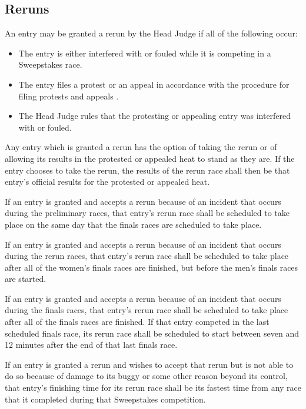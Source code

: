 \subsection{Reruns}

	An entry may be granted a rerun by the Head Judge if all of the following
	occur:
		
	\begin{itemize}

		\item The entry is either interfered with or fouled while it is competing
		in a Sweepstakes race.

		\item The entry files a protest or an appeal in accordance with the
		procedure for filing protests and appeals .

		\item The Head Judge rules that the protesting or appealing entry was
		interfered with or fouled.

	\end{itemize}

	Any entry which is granted a rerun has the option of taking the rerun or of
	allowing its results in the protested or appealed heat to stand as they are. If
	the entry chooses to take the rerun, the results of the rerun race shall then
	be that entry's official results for the protested or appealed heat.

	If an entry is granted and accepts a rerun because of an incident that occurs
	during the preliminary races, that entry's rerun race shall be scheduled to
	take place on the same day that the finals races are scheduled to take place.

	If an entry is granted and accepts a rerun because of an incident that occurs
	during the rerun races, that entry's rerun race shall be scheduled to take
	place after all of the women's finals races are finished, but before the men's
	finals races are started.

	If an entry is granted and accepts a rerun because of an incident that occurs
	during the finals races, that entry's rerun race shall be scheduled to take
	place after all of the finals races are finished. If that entry competed in the
	last scheduled finals race, its rerun race shall be scheduled to start between
	seven and 12 minutes after the end of that last finals race.

	If an entry is granted a rerun and wishes to accept that rerun but is not able
	to do so because of damage to its buggy or some other reason beyond its
	control, that entry's finishing time for its rerun race shall be its fastest
	time from any race that it completed during that Sweepstakes competition.

